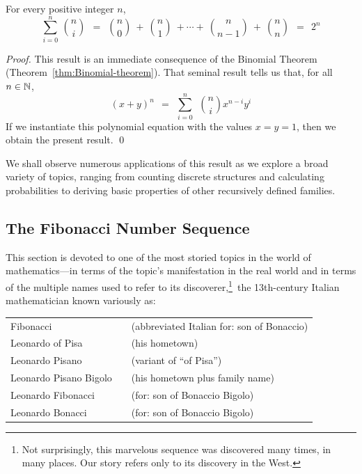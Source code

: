 \begin{prop}
\label{thm:sumsof-binomcoeff}
For every positive integer $n$,
\[
\sum_{i=0}^n \ {n \choose i} \ \ = \ \
{n \choose 0} \ + \ {n \choose 1} \ + \cdots + \ {n \choose {n-1}} \ + \ {n \choose n} \ \ = \ \ 2^n
\]
\end{prop}

\begin{proof}
This result is an immediate consequence of the Binomial Theorem 
(Theorem~\ref{thm:Binomial-theorem}).  That seminal result tells us that, for all $n \in \mathbb{N}$,
\[
(x+y)^n \ \ = \ \ \sum_{i=0}^n \ \ {n \choose i} x^{n-i} y^i
\]
If we instantiate this polynomial equation with the values $x = y = 1$, then we obtain the present result.  \qed
\end{proof}

\smallskip

We shall observe numerous applications of this result as we explore a broad variety of topics, ranging from counting discrete structures and calculating probabilities to deriving basic properties of other recursively defined families.

\subsection{The Fibonacci Number Sequence}
\label{sec:Fibonacci}

This section is devoted to one of the most storied topics in the world of mathematics---in terms of the topic's manifestation in the real world and in terms of the multiple names used to refer to its discoverer,\footnote{Not surprisingly, this marvelous sequence was discovered many times, in many places.  Our story refers only to its discovery in the West.}~the 13th-century Italian mathematician known variously as:

\smallskip

\begin{tabular}{lcl}
Fibonacci                         &  &(abbreviated Italian for: son of Bonaccio) \\
Leonardo of Pisa             &  & (his hometown) \\
Leonardo Pisano             &  & (variant of ``of Pisa'') \\
Leonardo Pisano Bigolo  &  & (his hometown plus family name) \\
Leonardo Fibonacci        &  & (for: son of Bonaccio Bigolo) \\
Leonardo Bonacci           &   & (for: son of Bonaccio Bigolo) \\
\end{tabular}

